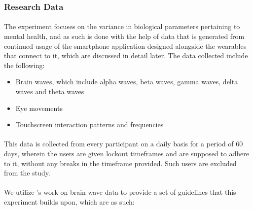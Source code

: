 \documentclass{article}
\begin{document}
\subsubsection{Research Data}

\paragraph{} The experiment focuses on the variance in biological parameters pertaining to mental health, and as such is done with the help of data that is generated from continued usage of the smartphone application designed alongside the wearables that connect to it, which are discussed in detail later. The data collected include the following:

\begin{itemize}
    \item Brain waves, which include alpha waves, beta waves, gamma waves, delta waves and theta waves
    \item Eye movements
    \item Touchscreen interaction patterns and frequencies
\end{itemize}

\paragraph{} This data is collected from every participant on a daily basis for a period of 60 days, wherein the users are given lockout timeframes and are supposed to adhere to it, without any breaks in the timeframe provided. Such users are excluded from the study.

\paragraph{} We utilize \citeauthor{buzsaki2006rhythms}'s work on brain wave data to provide a set of guidelines that this experiment builds upon, which are as such:
\end{document}
